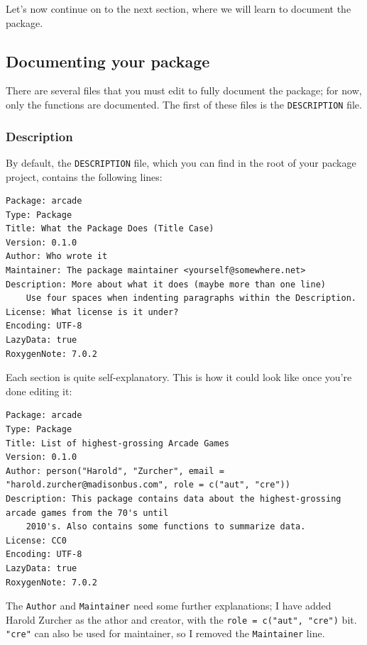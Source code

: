 \documentclass[
]{article}
\begin{document}
Let's now continue on to the next section, where we will learn to document the package.

\hypertarget{documenting-your-package}{%
\subsection{Documenting your package}\label{documenting-your-package}}

There are several files that you must edit to fully document the package; for now, only the functions
are documented. The first of these files is the \texttt{DESCRIPTION} file.

\hypertarget{description}{%
\subsubsection{Description}\label{description}}

By default, the \texttt{DESCRIPTION} file, which you can find in the root of your package project, contains
the following lines:

\begin{verbatim}
Package: arcade
Type: Package
Title: What the Package Does (Title Case)
Version: 0.1.0
Author: Who wrote it
Maintainer: The package maintainer <yourself@somewhere.net>
Description: More about what it does (maybe more than one line)
    Use four spaces when indenting paragraphs within the Description.
License: What license is it under?
Encoding: UTF-8
LazyData: true
RoxygenNote: 7.0.2
\end{verbatim}

Each section is quite self-explanatory. This is how it could look like once you're done editing it:

\begin{verbatim}
Package: arcade
Type: Package
Title: List of highest-grossing Arcade Games
Version: 0.1.0
Author: person("Harold", "Zurcher", email = "harold.zurcher@madisonbus.com", role = c("aut", "cre"))
Description: This package contains data about the highest-grossing arcade games from the 70's until
    2010's. Also contains some functions to summarize data.
License: CC0
Encoding: UTF-8
LazyData: true
RoxygenNote: 7.0.2
\end{verbatim}

The \texttt{Author} and \texttt{Maintainer} need some further explanations; I have added Harold Zurcher as
the athor and creator, with the \texttt{role\ =\ c("aut",\ "cre")} bit. \texttt{"cre"} can also be used for
maintainer, so I removed the \texttt{Maintainer} line.
\end{document}
